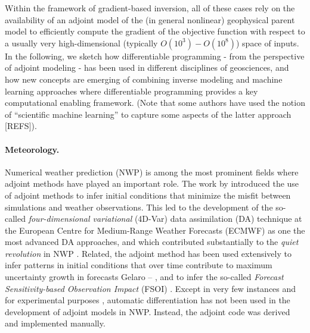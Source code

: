 %
Within the framework of gradient-based inversion, all of these cases rely on the availability of an adjoint model of the (in general nonlinear) geophysical parent model to efficiently compute the gradient of the objective function with respect to a usually very high-dimensional (typically $O(10^3) - O(10^8)$) space of inputs.
In the following, we sketch how differentiable programming - from the perspective of adjoint modeling - has been used in different disciplines of geosciences, and how new concepts are emerging of combining inverse modeling and machine learning approaches where differentiable programming provides a key computational enabling framework. (Note that some authors have used the notion of ``scientific machine learning'' to capture some aspects of the latter approach [REFS]).

\paragraph{Meteorology.}
Numerical weather prediction (NWP) is among the most prominent fields where adjoint methods have played an important role. 
The work by \cite{Talagrand.1987,Courtier.1987} introduced the use of adjoint methods to infer initial conditions that minimize the misfit between simulations and weather observations. 
This led to the development of the so-called \textit{four-dimensional variational} (4D-Var) data assimilation (DA) technique \cite{Rabier.1992,Rabier:2000uu} at the European Centre for Medium-Range Weather Forecasts (ECMWF) as one the most advanced DA approaches, and which contributed substantially to the \textit{quiet revolution} in NWP \cite{Bauer.2015}.
Related, the adjoint method has been used extensively to infer patterns in initial conditions that over time contribute to maximum uncertainty growth in forecasts Gelaro -- \cite{REFS}, and to infer the so-called \textit{Forecast Sensitivity-based Observation Impact} (FSOI) \cite{Langland:2004jo}.
Except in very few instances and for experimental purposes \cite{Giering.2006}, automatic differentiation has not been used in the development of adjoint models in NWP.
Instead, the adjoint code was derived and implemented manually.

